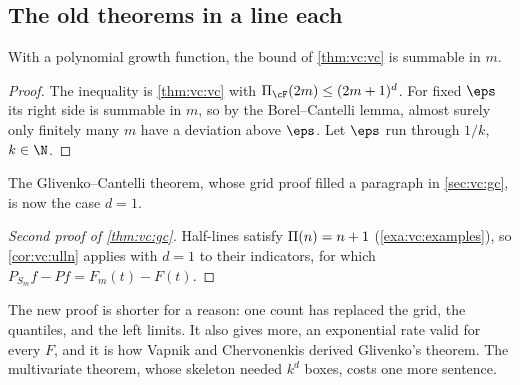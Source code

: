 \begin{refsection}
\subsection{The old theorems in a line each}\label{sec:vc:old}

With a polynomial growth function, the bound of \cref{thm:vc:vc} is summable in $m$.


\begin{proof}
The inequality is \cref{thm:vc:vc} with $\vcGrowth_{\cF}(2m)\le(2m+1)^d$. For fixed $\eps$ its right side is summable in $m$, so by the Borel--Cantelli lemma, almost surely only finitely many $m$ have a deviation above $\eps$. Let $\eps$ run through $1/k$, $k\in\N$.
\end{proof}

The Glivenko--Cantelli theorem, whose grid proof filled a paragraph in \cref{sec:vc:gc}, is now the case $d=1$.

\begin{proof}[Second proof of \cref{thm:vc:gc}]
Half-lines satisfy $\Pi(n) = n+1$ (\cref{exa:vc:examples}), so \cref{cor:vc:ulln} applies with $d = 1$ to their indicators, for which $P_{S_m}f-Pf = F_m(t)-F(t)$.
\end{proof}

The new proof is shorter for a reason: one count has replaced the grid, the quantiles, and the left limits. It also gives more, an exponential rate valid for every $F$, and it is how Vapnik and Chervonenkis derived Glivenko's theorem. The multivariate theorem, whose skeleton needed $k^d$ boxes, costs one more sentence.



\end{refsection}

